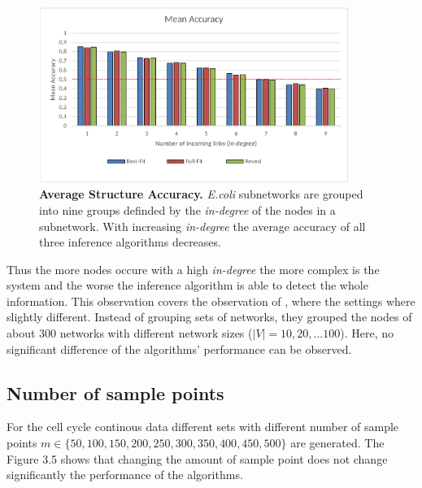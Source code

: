 \begin{figure}[H]
\captionsetup{width=0.9\linewidth}
\centering
\includegraphics[width=0.9\textwidth]{./Bilder/Scoring/insilico/1_Indegree_Runtime/MeanAcc_indegree.pdf}
\caption[Average Structure Accuracy]{\textbf{Average Structure Accuracy.} \textit{E.coli} subnetworks are grouped into nine groups definded by the \textit{in-degree} of the nodes in a subnetwork. With increasing \textit{in-degree} the average accuracy of all three inference algorithms decreases. }
\label{fig:}
\end{figure}

Thus the more nodes occure with a high \textit{in-degree} the more complex is the system and the worse the inference algorithm is able to detect the whole information. This observation covers the observation of \citep{10.1371/journal.pone.0171097}, where the settings where slightly different. Instead of grouping sets of networks, they grouped the nodes of about 300 networks with different network sizes ($|V| = 10,20,$...$100$). Here, no significant difference of the algorithms' performance can be observed.\\

\subsection*{Number of sample points}
For the cell cycle continous data different sets with different number of sample points $m\in \{50,100,150,200,250,300,350,400,450,500\}$ are generated. The Figure 3.5 shows that changing the amount of sample point does not change significantly the performance of the algorithms. 

